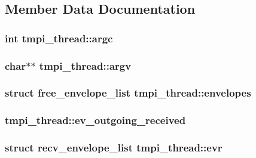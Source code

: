\subsection{\-Member \-Data \-Documentation}
\hypertarget{structtmpi__thread_a709aa70ca12a0f49054424116a185669}{
\subsubsection[{argc}]{\setlength{\rightskip}{0pt plus 5cm}int {\bf tmpi\-\_\-thread\-::argc}}}\label{structtmpi__thread_a709aa70ca12a0f49054424116a185669}
\hypertarget{structtmpi__thread_abf299d49227ccbe38b07fbea42ee9920}{
\subsubsection[{argv}]{\setlength{\rightskip}{0pt plus 5cm}char$\ast$$\ast$ {\bf tmpi\-\_\-thread\-::argv}}}\label{structtmpi__thread_abf299d49227ccbe38b07fbea42ee9920}
\hypertarget{structtmpi__thread_afffaf584fa465917dc02bc46723aff4f}{
\subsubsection[{envelopes}]{\setlength{\rightskip}{0pt plus 5cm}struct {\bf free\-\_\-envelope\-\_\-list} {\bf tmpi\-\_\-thread\-::envelopes}}}\label{structtmpi__thread_afffaf584fa465917dc02bc46723aff4f}
\hypertarget{structtmpi__thread_ab98bab078a79355851cadcf9a64479a1}{
\subsubsection[{ev\-\_\-outgoing\-\_\-received}]{ {\bf tmpi\-\_\-thread\-::ev\-\_\-outgoing\-\_\-received}}}\label{structtmpi__thread_ab98bab078a79355851cadcf9a64479a1}
\hypertarget{structtmpi__thread_ab48603884206cf84d6265100e0f6822b}{
\subsubsection[{evr}]{\setlength{\rightskip}{0pt plus 5cm}struct {\bf recv\-\_\-envelope\-\_\-list} {\bf tmpi\-\_\-thread\-::evr}}}\label{structtmpi__thread_ab48603884206cf84d6265100e0f6822b}
